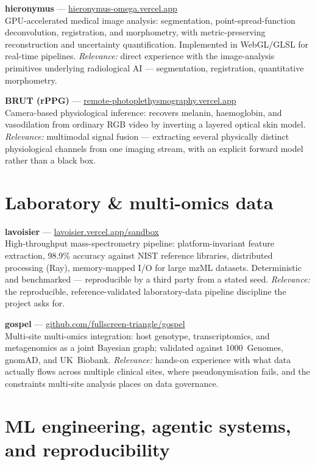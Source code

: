 \documentclass[11pt,a4paper]{article}
\begin{document}
\textbf{hieronymus} --- \href{https://hieronymus-omega.vercel.app/}{hieronymus-omega.vercel.app}\\
GPU-accelerated medical image analysis: segmentation, point-spread-function
deconvolution, registration, and morphometry, with metric-preserving reconstruction
and uncertainty quantification. Implemented in WebGL/GLSL for real-time pipelines.
\emph{Relevance:} direct experience with the image-analysis primitives underlying
radiological AI --- segmentation, registration, quantitative morphometry.

\textbf{BRUT (rPPG)} --- \href{https://remote-photoplethysmography.vercel.app/}{remote-photoplethysmography.vercel.app}\\
Camera-based physiological inference: recovers melanin, haemoglobin, and vasodilation
from ordinary RGB video by inverting a layered optical skin model. \emph{Relevance:}
multimodal signal fusion --- extracting several physically distinct physiological
channels from one imaging stream, with an explicit forward model rather than a
black box.

\section{Laboratory \& multi-omics data}

\textbf{lavoisier} --- \href{https://lavoisier.vercel.app/sandbox}{lavoisier.vercel.app/sandbox}\\
High-throughput mass-spectrometry pipeline: platform-invariant feature extraction,
98.9\% accuracy against NIST reference libraries, distributed processing (Ray),
memory-mapped I/O for large mzML datasets. Deterministic and benchmarked ---
reproducible by a third party from a stated seed. \emph{Relevance:} the reproducible,
reference-validated laboratory-data pipeline discipline the project asks for.

\textbf{gospel} --- \href{https://github.com/fullscreen-triangle/gospel}{github.com/fullscreen-triangle/gospel}\\
Multi-site multi-omics integration: host genotype, transcriptomics, and metagenomics
as a joint Bayesian graph; validated against 1000~Genomes, gnomAD, and UK~Biobank.
\emph{Relevance:} hands-on experience with what data actually flows across multiple
clinical sites, where pseudonymisation fails, and the constraints multi-site
analysis places on data governance.

\section{ML engineering, agentic systems, and reproducibility}
\end{document}
